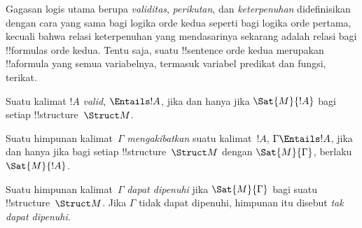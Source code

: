 \documentclass[../../../include/open-logic-section]{subfiles}
\begin{document}

\begin{explain}
Gagasan logis utama berupa \emph{validitas}, \emph{perikutan}, dan
\emph{keterpenuhan} didefinisikan dengan cara yang sama bagi logika orde kedua
seperti bagi logika orde pertama, kecuali bahwa relasi keterpenuhan yang
mendasarinya sekarang adalah relasi bagi !!{formula}s orde kedua. Tentu saja,
suatu !!{sentence} orde kedua merupakan !!a{formula} yang semua variabelnya,
termasuk variabel predikat dan fungsi, terikat.
\end{explain}

\begin{defn}[Validitas]
Suatu kalimat $!A$ \emph{valid}, $\Entails !A$, jika dan hanya jika
$\Sat{M}{!A}$ bagi setiap !!{structure}~$\Struct M$.
\end{defn}

\begin{defn}[Perikutan]
Suatu himpunan kalimat~$\Gamma$ \emph{mengakibatkan} suatu kalimat~$!A$,
$\Gamma \Entails !A$, jika dan hanya jika bagi setiap
!!{structure}~$\Struct M$ dengan $\Sat{M}{\Gamma}$, berlaku
$\Sat{M}{!A}$.
\end{defn}

\begin{defn}[Keterpenuhan]
Suatu himpunan kalimat~$\Gamma$ \emph{dapat dipenuhi} jika
$\Sat{M}{\Gamma}$ bagi suatu !!{structure}~$\Struct M$. Jika $\Gamma$ tidak
dapat dipenuhi, himpunan itu disebut \emph{tak dapat dipenuhi}.
\end{defn}
\end{document}
